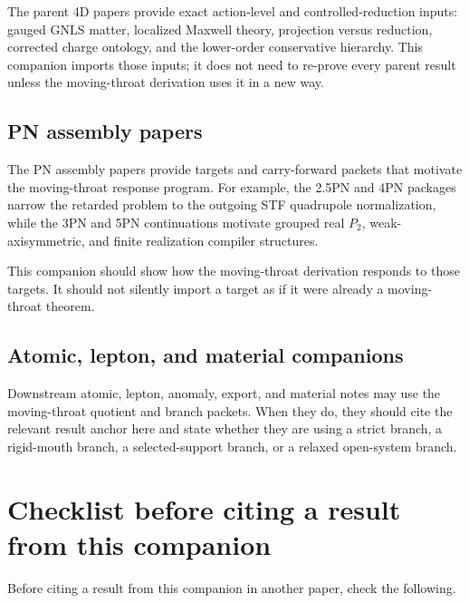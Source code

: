 The parent 4D papers provide exact action-level and controlled-reduction inputs: gauged GNLS matter, localized Maxwell theory, projection versus reduction, corrected charge ontology, and the lower-order conservative hierarchy.  This companion imports those inputs; it does not need to re-prove every parent result unless the moving-throat derivation uses it in a new way.

\subsection{PN assembly papers}
\label{subsec:relationship-pn-papers}

The PN assembly papers provide targets and carry-forward packets that motivate the moving-throat response program.  For example, the 2.5PN and 4PN packages narrow the retarded problem to the outgoing STF quadrupole normalization, while the 3PN and 5PN continuations motivate grouped real \(P_2\), weak-axisymmetric, and finite realization compiler structures.

This companion should show how the moving-throat derivation responds to those targets.  It should not silently import a target as if it were already a moving-throat theorem.

\subsection{Atomic, lepton, and material companions}
\label{subsec:relationship-downstream-companions}

Downstream atomic, lepton, anomaly, export, and material notes may use the moving-throat quotient and branch packets.  When they do, they should cite the relevant result anchor here and state whether they are using a strict branch, a rigid-mouth branch, a selected-support branch, or a relaxed open-system branch.

\section{Checklist before citing a result from this companion}
\label{sec:checklist-before-citing}

Before citing a result from this companion in another paper, check the following.

